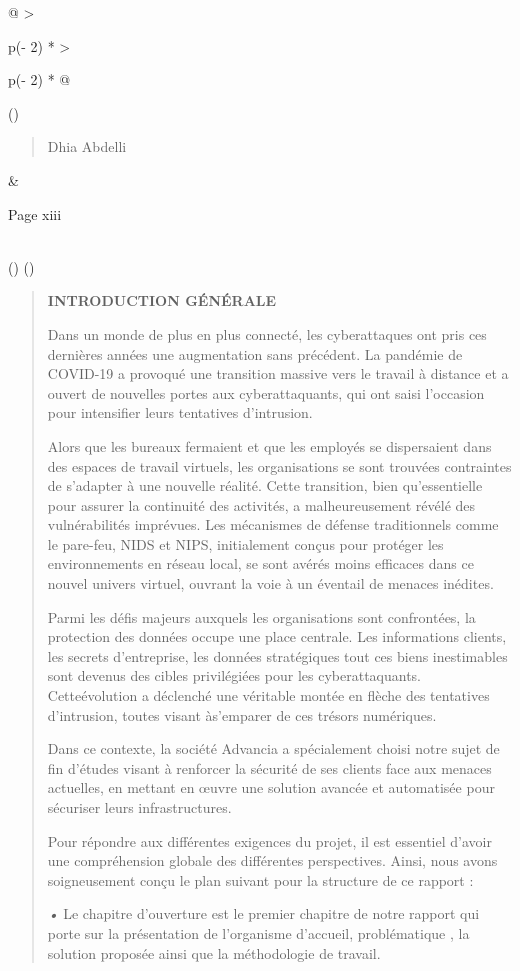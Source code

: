 \documentclass[
]{article}
\begin{document}
\begin{longtable}[]{@{}
  >{\raggedright\arraybackslash}p{(\columnwidth - 2\tabcolsep) * }
  >{\raggedright\arraybackslash}p{(\columnwidth - 2\tabcolsep) * }@{}}
\toprule()
\begin{minipage}[b]{\linewidth}\raggedright
\begin{quote}
Dhia Abdelli
\end{quote}
\end{minipage} & \begin{minipage}[b]{\linewidth}\raggedright
Page xiii
\end{minipage} \\
\midrule()
\endhead
\bottomrule()
\end{longtable}

\begin{quote}
\textbf{INTRODUCTION GÉNÉRALE}

Dans un monde de plus en plus connecté, les cyberattaques ont pris ces
dernières années une augmentation sans précédent. La pandémie de
COVID-19 a provoqué une transition massive vers le travail à distance et
a ouvert de nouvelles portes aux cyberattaquants, qui ont saisi
l'occasion pour intensifier leurs tentatives d'intrusion.

Alors que les bureaux fermaient et que les employés se dispersaient dans
des espaces de travail virtuels, les organisations se sont trouvées
contraintes de s'adapter à une nouvelle réalité. Cette transition, bien
qu'essentielle pour assurer la continuité des activités, a
malheureusement révélé des vulnérabilités imprévues. Les mécanismes de
défense traditionnels comme le pare-feu, NIDS et NIPS, initialement
conçus pour protéger les environnements en réseau local, se sont avérés
moins efficaces dans ce nouvel univers virtuel, ouvrant la voie à un
éventail de menaces inédites.

Parmi les défis majeurs auxquels les organisations sont confrontées, la
protection des données occupe une place centrale. Les informations
clients, les secrets d'entreprise, les données stratégiques tout ces
biens inestimables sont devenus des cibles privilégiées pour les
cyberattaquants. Cetteévolution a déclenché une véritable montée en
flèche des tentatives d'intrusion, toutes visant às'emparer de ces
trésors numériques.

Dans ce contexte, la société Advancia a spécialement choisi notre sujet
de fin d'études visant à renforcer la sécurité de ses clients face aux
menaces actuelles, en mettant en œuvre une solution avancée et
automatisée pour sécuriser leurs infrastructures.

Pour répondre aux différentes exigences du projet, il est essentiel
d'avoir une compréhension globale des différentes perspectives. Ainsi,
nous avons soigneusement conçu le plan suivant pour la structure de ce
rapport :

\emph{•} Le chapitre d'ouverture est le premier chapitre de notre
rapport qui porte sur la présentation de l'organisme d'accueil,
problématique , la solution proposée ainsi que la méthodologie de
travail.
\end{quote}
\end{document}
